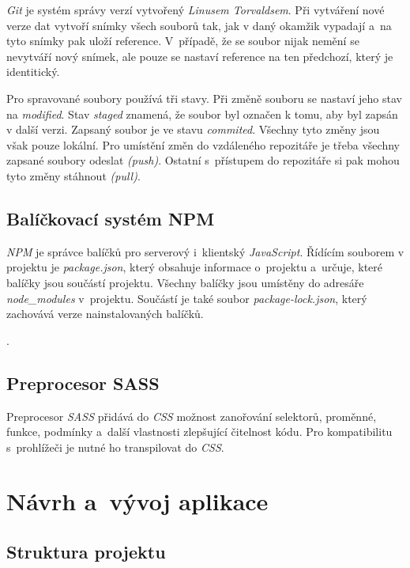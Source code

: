 \documentclass[a4paper,12pt]{article}
\begin{document}
\textit{Git} je systém správy verzí vytvořený \textit{Linusem Torvaldsem}. Při vytváření nové verze dat vytvoří snímky všech souborů tak, jak v daný okamžik vypadají a~na tyto snímky pak uloží reference. V~případě, že se soubor nijak nemění se nevytváří nový snímek, ale pouze se nastaví reference na ten předchozí, který je identitický.~\cite{git}

Pro spravované soubory používá tři stavy. Při změně souboru se nastaví jeho stav na \textit{modified}. Stav \textit{staged} znamená, že soubor byl označen k tomu, aby byl zapsán v další verzi. Zapsaný soubor je ve stavu \textit{commited}. Všechny tyto změny jsou však pouze lokální. Pro umístění změn do vzdáleného repozitáře je třeba všechny zapsané soubory odeslat \textit{(push)}. Ostatní s~přístupem do repozitáře si pak mohou tyto změny stáhnout \textit{(pull)}.~\cite{git}

\subsection{Balíčkovací systém NPM}

\textit{NPM} je správce balíčků pro serverový i~klientský \textit{JavaScript}. Řídícím souborem v projektu je \textit{package.json}, který obsahuje informace o~projektu a~určuje, které balíčky jsou součástí projektu.  Všechny balíčky jsou umístěny do adresáře \textit{node\_modules} v~projektu. Součástí je také soubor \textit{package-lock.json}, který zachovává verze nainstalovaných balíčků.~\cite{nodebook}

.

\vspace*{-1.5cm}
\subsection{Preprocesor SASS}

Preprocesor \textit{SASS} přidává do \textit{CSS} možnost zanořování selektorů, proměnné, funkce, podmínky a~další vlastnosti zlepšující čitelnost kódu. Pro kompatibilitu s~prohlížeči je nutné ho transpilovat do \textit{CSS}.~\cite{sass}

\section{Návrh a~vývoj aplikace}

\subsection{Struktura projektu}
\end{document}
